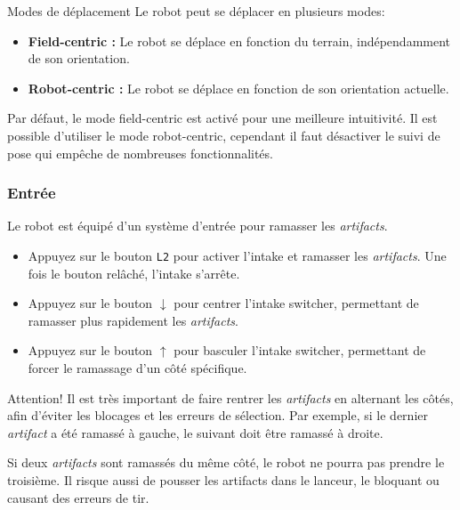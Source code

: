 \documentclass[12pt, a4paper]{report}
\begin{document}
    \begin{myinfo}{Modes de déplacement}
        Le robot peut se déplacer en plusieurs modes:
        \begin{itemize}
            \item \textbf{Field-centric :} Le robot se déplace en fonction du terrain, indépendamment de son orientation.
            \item \textbf{Robot-centric :} Le robot se déplace en fonction de son orientation actuelle.
        \end{itemize}
        Par défaut, le mode field-centric est activé pour une meilleure intuitivité.
        Il est possible d'utiliser le mode robot-centric, cependant il faut désactiver le suivi de pose qui empêche de nombreuses fonctionnalités.
    \end{myinfo}

    \subsubsection{Entrée}

    Le robot est équipé d'un système d'entrée pour ramasser les \textit{artifacts}.
    \begin{itemize}
        \item Appuyez sur le bouton \texttt{L2} pour activer l'intake et ramasser les \textit{artifacts}. Une fois le bouton relâché, l'intake s'arrête.
        \item Appuyez sur le bouton \texttt{$\downarrow$} pour centrer l'intake switcher, permettant de ramasser plus rapidement les \textit{artifacts}.
        \item Appuyez sur le bouton \texttt{$\uparrow$} pour basculer l'intake switcher, permettant de forcer le ramassage d'un côté spécifique.
    \end{itemize}

    \begin{myinfo}{Attention!}
        Il est très important de faire rentrer les \textit{artifacts} en alternant les côtés, afin d'éviter les blocages et les erreurs de sélection.
        Par exemple, si le dernier \textit{artifact} a été ramassé à gauche, le suivant doit être ramassé à droite.

        Si deux \textit{artifacts} sont ramassés du même côté, le robot ne pourra pas prendre le troisième. Il risque aussi de pousser les artifacts dans le lanceur, le bloquant ou causant des erreurs de tir.
    \end{myinfo}
\end{document}
